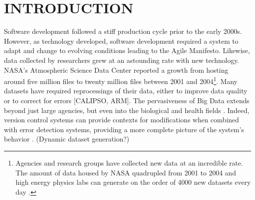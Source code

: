 
\chapter{INTRODUCTION}

Software development followed a stiff production cycle prior to the early 2000s.
However, as technology developed, software development required a system to adapt and change to evolving conditions leading to the Agile Manifesto.
Likewise, data collected by researchers grew at an astounding rate with new technology.
NASA's Atmospheric Science Data Center reported a growth from hosting around five million files to twenty million files between 2001 and 2004\footnote{Agencies and research groups have collected new data at an incredible rate.
The amount of data housed by NASA quadrupled from 2001 to 2004 \cite{Barkstrom_digitallibrary} and high energy physics labs can generate on the order of 4000 new datasets every day \cite{Flouris04clotho:transparent}.}.
Many datasets have required reprocessings of their data, either to improve data quality or to correct for errors [CALIPSO, ARM].
The pervasiveness of Big Data extends beyond just large agencies, but even into the biological and health fields \cite{burrows2006review} \cite{Tagger2005}.
Indeed, version control systems can provide contexts for modifications when combined with error detection systems, providing a more complete picture of the system's behavior \cite{Fischer2003}.  (Dynamic dataset generation?)

